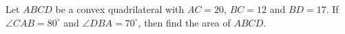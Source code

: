 Let $ABCD$ be a convex quadrilateral with $AC=20$, $BC=12$ and $BD=17$. If $\angle{CAB}=80^{\circ}$ and $\angle{DBA}=70^{\circ}$, then find the area of $ABCD$.
